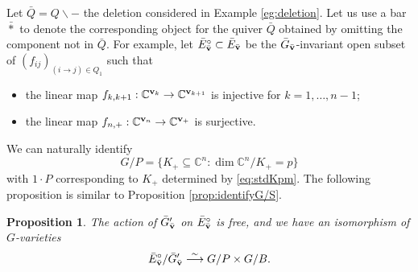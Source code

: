 \documentclass[12pt,reqno]{amsart}
\numberwithin{equation}{section}
\newtheorem{prop}[theorem]{Proposition}
\theoremstyle{definition}
\begin{document}
Let $\bar{Q}= Q\backslash -$ the deletion considered in Example \ref{eg:deletion}. 
Let us use a bar $\bar{*}$ to denote the corresponding object for the quiver $\bar{Q}$ obtained by omitting the component not in $\bar{Q}$. 
For example, let $\bar{E}_{\bar{\mathbf{v}}}^\circ\subset \bar{E}_{\bar{\mathbf{v}}}$ be the $\bar{G}_{\bar{\mathbf{v}}}$-invariant open subset of $(f_{ij})_{(i\to j)\in Q_1}$ such that 
\begin{itemize}
    \item the linear map 
    $f_{k,k+1}:\mathbb{C}^{\mathbf{v}_k}\to \mathbb{C}^{\mathbf{v}_{k+1}}$ is injective for $k=1,\ldots,n-1$; 
    \item the linear map 
    $f_{n,+}:\mathbb{C}^{\mathbf{v}_n}\to \mathbb{C}^{\mathbf{v}_+}$ is surjective.
\end{itemize} 
We can naturally identify 
$$G/P =\{K_+\subseteq \mathbb{C}^n:\dim \mathbb{C}^n/K_+=p\}$$
with $1\cdot P$ corresponding to $K_+$ determined by \eqref{eq:stdKpm}. 
The following proposition is similar to Proposition \ref{prop:identifyG/S}.  


\begin{prop}
The action of $\bar{G}_{\bar{\mathbf{v}}}'$ on $\bar{E}_{\bar{\mathbf{v}}}^\circ$ is free, and we have an isomorphism of $G$-varieties
$$
\bar{E}_{\bar{\mathbf{v}}}^\circ/\bar{G}_{\bar{\mathbf{v}}}'\stackrel{\sim}\longrightarrow G/P\times G/B. $$
\end{prop}
\end{document}
